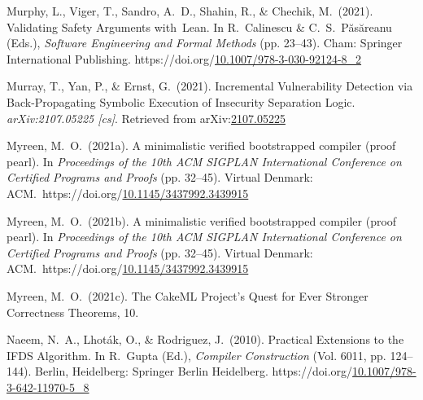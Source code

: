 \documentclass[12pt,twoside]{article}
\begin{document}
{\begin{thebibliography}{1079}
\mdbibitemlabel{}Murphy, L., Viger, T., Sandro, A.~D., Shahin, R., \& Chechik, M.~(2021). Validating Safety Arguments with Lean. In R.~Calinescu \& C.~S.~Păsăreanu (Eds.), \emph{Software Engineering and Formal Methods} (pp. 23–43). Cham: Springer International Publishing. https://doi.org/\href{https://dx.doi.org/10.1007/978-3-030-92124-8_2}{10.1007/978-3-030-92124-8\_2}%

\mdbibitemlabel{}Murray, T., Yan, P., \& Ernst, G.~(2021). Incremental Vulnerability Detection via Back-Propagating Symbolic Execution of Insecurity Separation Logic. \emph{arXiv:2107.05225 {}[cs]}. Retrieved from arXiv:\href{http://arxiv.org/abs/2107.05225}{2107.05225}%

\mdbibitemlabel{}Myreen, M.~O.~(2021a). A minimalistic verified bootstrapped compiler (proof pearl). In \emph{Proceedings of the 10th ACM SIGPLAN International Conference on Certified Programs and Proofs} (pp. 32–45). Virtual Denmark: ACM.~https://doi.org/\href{https://dx.doi.org/10.1145/3437992.3439915}{10.1145/3437992.3439915}%

\mdbibitemlabel{}Myreen, M.~O.~(2021b). A minimalistic verified bootstrapped compiler (proof pearl). In \emph{Proceedings of the 10th ACM SIGPLAN International Conference on Certified Programs and Proofs} (pp. 32–45). Virtual Denmark: ACM.~https://doi.org/\href{https://dx.doi.org/10.1145/3437992.3439915}{10.1145/3437992.3439915}%

\mdbibitemlabel{}Myreen, M.~O.~(2021c). The CakeML Project’s Quest for Ever Stronger Correctness Theorems, 10.%

\mdbibitemlabel{}Naeem, N.~A., Lhoták, O., \& Rodriguez, J.~(2010). Practical Extensions to the IFDS Algorithm. In R.~Gupta (Ed.), \emph{Compiler Construction} (Vol. 6011, pp. 124–144). Berlin, Heidelberg: Springer Berlin Heidelberg. https://doi.org/\href{https://dx.doi.org/10.1007/978-3-642-11970-5_8}{10.1007/978-3-642-11970-5\_8}%


\end{thebibliography}}
\end{document}
